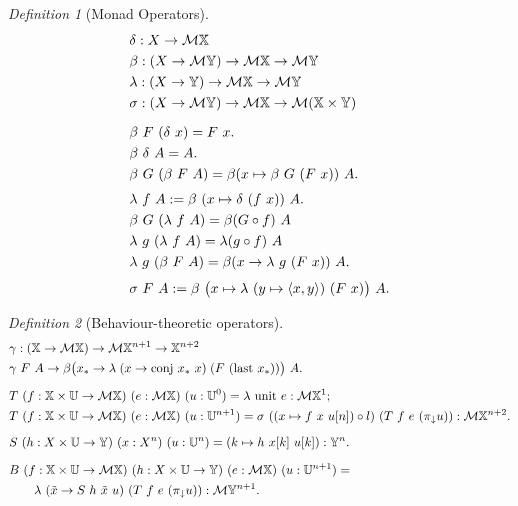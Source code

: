 \documentclass[12pt,a4paper]{article}
\theoremstyle{remark}
\newtheorem*{definition*}{Definition}
\newcommand{\pure}{\delta}
\newcommand{\bind}{\beta}
\newcommand{\lift}{\lambda}
\renewcommand{\skew}{\sigma}
\newcommand{\scnj}{\gamma}
\newcommand{\U}{\mathbb{U}}
\newcommand{\X}{\mathbb{X}}
\newcommand{\Y}{\mathbb{Y}}
\newcommand{\M}{\mathcal{M}}
\newcommand{\p}{\pi}
\newcommand{\pr}{\p_{\downarrow}}
\newcommand{\conjW}{\mathrm{conj}}
\newcommand{\lastW}{\mathrm{last}}
\begin{document}
\begin{definition*}[Monad Operators]
\[ \begin{aligned}
&\pure : X \to \M\X \\
&\bind : (X \to \M\Y) \to \M\X \to \M\Y \\
&\lift : (X \to \Y) \to \M\X \to \M\Y \\
&\skew : (X \to \M\Y) \to \M\X \to \M(\X\times\Y) \\[2\jot]
&\bind\ F\ (\pure\ x) = F\ x .\\
&\bind\ \pure\ A = A . \\
&\bind\ G\ (\bind\ F\ A) = \bind (x \mapsto \bind\ G\ (F\ x))\ A. \\[\jot]
&\lift\ f\ A := \bind\ (x \mapsto \pure\ (f\ x))\ A. \\
&\bind\ G\ (\lift\ f\ A) = \bind (G \circ f)\ A \\
&\lift\ g\ (\lift\ f\ A) = \lift (g \circ f)\ A \\
&\lift\ g\ (\bind\ F\ A) = \bind (x \to \lift\ g\ (F\ x))\ A. \\[\jot]
&\skew\ F\ A := \bind\ \bigl(x \mapsto \lift\ (y \mapsto \langle x,y\rangle)\ (F\ x)\bigr)\ A.
\end{aligned} \]
\end{definition*}

\begin{definition*}[Behaviour-theoretic operators]
\[ \begin{aligned}
&\scnj: (\X\to\M\X) \to \M\X^{n+1} \to \X^{n+2} \\
&\scnj\ F\ A \to \bind \bigl( x_* \to \lift\;(x \to \conjW\ x_*\ x)\;(F\ (\lastW\ x_*)) \bigr)\ A. \\[2\jot]
&T\ (f:\X\times\U\to\M\X)\ (e:\M\X)\ (u:\U^0) = \lift\ \mathrm{unit}\ e : \M\X^{1}; \\
&T\ (f:\X\times\U\to\M\X)\ (e:\M\X)\ (u:\U^{n+1}) = \skew\ ((x\mapsto f\ x\ u[n])\circ l)\ (T\ f\ e\ (\pr u)) : \M\X^{n+2} . \\[2\jot]
&S\ (h:X\times\U\to\Y)\ (x:X^n)\ (u:\U^n) = (k \mapsto h\ x[k]\ u[k]) : \Y^n . \\[2\jot]
&B\ (f:\X\times\U\to\M\X)\ (h:X\times\U\to\Y)\ (e:\M\X)\ (u:\U^{n+1}) = \\ & \qquad \lift\ (\tilde{x}\to S\ h\ \tilde{x}\ u)\ (T\ f\ e\ (\pr u)) : \M\Y^{n+1}.
\end{aligned} \]
\end{definition*}
\end{document}

